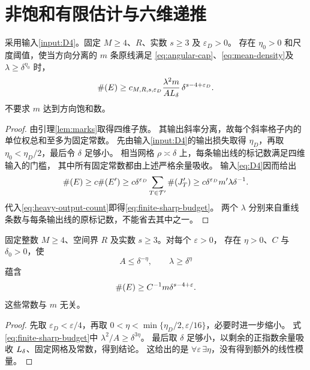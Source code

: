 \section{非饱和有限估计与六维递推}\label{sec:seeds}

\begin{proposition}[保留原条数的有限估计]\label{prop:finite}
采用输入\ref{input:D4}。固定 $M\ge4$、$R$、实数 $s\ge3$ 及 $\varepsilon_D>0$。
存在 $\eta_0>0$ 和尺度阈值，使当方向分离的 $m$ 条原线满足
\eqref{eq:angular-cap}、\eqref{eq:mean-density}及 $\lambda\ge\delta^{\eta_0}$ 时，
\begin{equation}\label{eq:finite-sharp-budget}
 \#\!\left(E\right)\ge
 c_{M,R,s,\varepsilon_D}
 \frac{\lambda^2m}{AL_\delta}\,
 \delta^{s-4+\varepsilon_D}.
\end{equation}
不要求 $m$ 达到方向饱和数。
\end{proposition}

\begin{proof}
由引理\ref{lem:marks}取得四维子族。
其输出斜率分离，故每个斜率格子内的单位权总和至多为固定常数。
先由输入\ref{input:D4}的输出损失取得 $\eta_D$，再取
$\eta_0<\eta_D/2$，最后令 $\delta$ 足够小。
相当网格 $\rho\asymp\delta$ 上，每条输出线的标记数满足四维输入的门槛，
其中所有固定常数都由上述严格余量吸收。
输入\eqref{eq:D4}因而给出
\[
 \#\!\left(E\right)\ge c\#\!\left(E'\right)
 \ge c\delta^{\varepsilon_D}\sum_{T\in\mathcal T'}\#\!\left(J'_T\right)
 \ge c\delta^{\varepsilon_D}m'\lambda\delta^{-1}.
\]
代入\eqref{eq:heavy-output-count}即得\eqref{eq:finite-sharp-budget}。
两个 $\lambda$ 分别来自重线条数与每条输出线的原标记数，不能省去其中之一。
\end{proof}

\begin{corollary}[显式小损失形式]\label{cor:uniform}
固定整数 $M\ge4$、空间界 $R$ 及实数 $s\ge3$。对每个 $\varepsilon>0$，
存在 $\eta>0$、$C$ 与 $\delta_0>0$，使
\begin{equation}\label{eq:tolerance-assumptions}
 A\le\delta^{-\eta},\qquad \lambda\ge\delta^\eta
\end{equation}
蕴含
\begin{equation}\label{eq:unsaturated-finite}
 \#\!\left(E\right)\ge C^{-1}m\delta^{s-4+\varepsilon}.
\end{equation}
这些常数与 $m$ 无关。
\end{corollary}

\begin{proof}
先取 $\varepsilon_D<\varepsilon/4$，再取
$0<\eta<\min\{\eta_D/2,\varepsilon/16\}$，必要时进一步缩小。
式\eqref{eq:finite-sharp-budget}中 $\lambda^2/A\ge\delta^{3\eta}$。
最后取 $\delta$ 足够小，以剩余的正指数余量吸收 $L_\delta$、固定网格及常数，得到结论。
这给出的是 $\forall\varepsilon\,\exists\eta$，没有得到额外的线性模量。
\end{proof}


